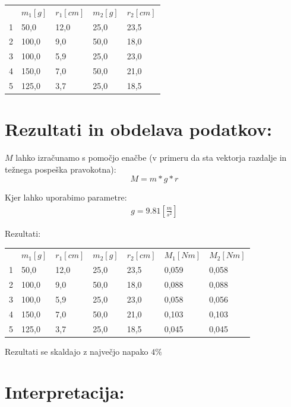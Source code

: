 \documentclass[a4paper]{article}
\begin{document}
\begin{table}[H]
\centering
\renewcommand{\arraystretch}{1.5}
\begin{tabular}{lllll}
   & $m_1 [g]$ & $r_1 [cm]$ & $m_2 [g]$ & $r_2 [cm]$ \\
1 & 50,0  & 12,0 & 25,0 & 23,5 \\
2 & 100,0 & 9,0  & 50,0 & 18,0 \\
3 & 100,0 & 5,9  & 25,0 & 23,0 \\
4 & 150,0 & 7,0  & 50,0 & 21,0 \\
5 & 125,0 & 3,7  & 25,0 & 18,5
\end{tabular}
\end{table}



\section*{Rezultati in obdelava podatkov:}


   $M$ lahko izračunamo s pomočjo enačbe (v primeru da sta vektorja razdalje in težnega pospeška pravokotna):
   \begin{equation}
      M = m*g*r
   \end{equation}

   
   Kjer lahko uporabimo parametre:
   \begin{gather}
      g = 9.81 [\frac{m}{s^2}]
   \end{gather}

Rezultati:
\begin{table}[H]
   \centering
   \renewcommand{\arraystretch}{1.5}
   \begin{tabular}{lllllll}
      & $m_1 [g]$ & $r_1 [cm]$ & $m_2 [g]$ & $r_2 [cm]$ & $M_1 [Nm]$ & $M_2 [Nm]$ \\
   1 & 50,0  & 12,0 & 25,0 & 23,5 & 0,059 & 0,058 \\
   2 & 100,0 & 9,0  & 50,0 & 18,0 & 0,088 & 0,088 \\
   3 & 100,0 & 5,9  & 25,0 & 23,0 & 0,058 & 0,056 \\
   4 & 150,0 & 7,0  & 50,0 & 21,0 & 0,103 & 0,103 \\
   5 & 125,0 & 3,7  & 25,0 & 18,5 & 0,045 & 0,045
\end{tabular}
\end{table}

Rezultati se skaldajo z največjo napako $4\%$
\section*{Interpretacija:}
\end{document}
